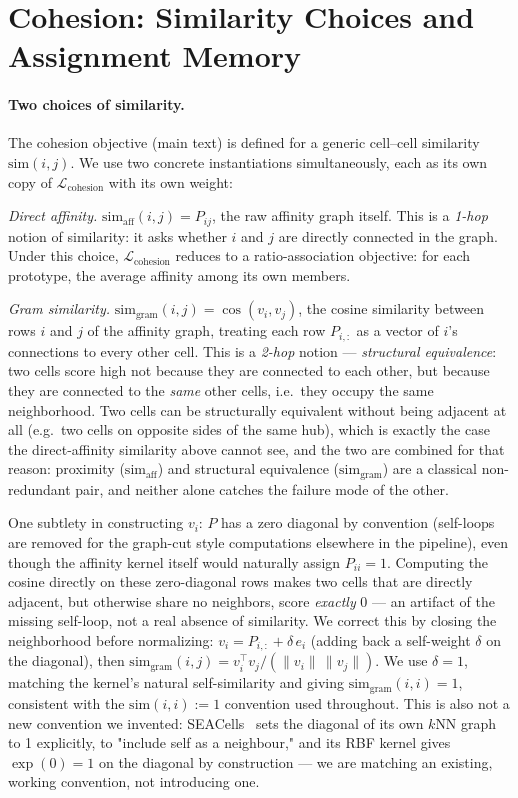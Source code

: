 \section{Cohesion: Similarity Choices and Assignment Memory}
\label{app:cohesion}

\paragraph{Two choices of similarity.}
The cohesion objective (main text) is defined for a generic cell--cell similarity $\mathrm{sim}(i,j)$. We use two concrete instantiations simultaneously, each as its own copy of $\mathcal{L}_{\text{cohesion}}$ with its own weight:

\emph{Direct affinity.} $\mathrm{sim}_{\text{aff}}(i,j) = P_{ij}$, the raw affinity graph itself. This is a \emph{1-hop} notion of similarity: it asks whether $i$ and $j$ are directly connected in the graph. Under this choice, $\mathcal{L}_{\text{cohesion}}$ reduces to a ratio-association objective: for each prototype, the average affinity among its own members.

\emph{Gram similarity.} $\mathrm{sim}_{\text{gram}}(i,j) = \cos(v_i, v_j)$, the cosine similarity between rows $i$ and $j$ of the affinity graph, treating each row $P_{i,:}$ as a vector of $i$'s connections to every other cell. This is a \emph{2-hop} notion --- \emph{structural equivalence}: two cells score high not because they are connected to each other, but because they are connected to the \emph{same} other cells, i.e.\ they occupy the same neighborhood. Two cells can be structurally equivalent without being adjacent at all (e.g.\ two cells on opposite sides of the same hub), which is exactly the case the direct-affinity similarity above cannot see, and the two are combined for that reason: proximity ($\mathrm{sim}_{\text{aff}}$) and structural equivalence ($\mathrm{sim}_{\text{gram}}$) are a classical non-redundant pair, and neither alone catches the failure mode of the other.

One subtlety in constructing $v_i$: $P$ has a zero diagonal by convention (self-loops are removed for the graph-cut style computations elsewhere in the pipeline), even though the affinity kernel itself would naturally assign $P_{ii}=1$. Computing the cosine directly on these zero-diagonal rows makes two cells that are directly adjacent, but otherwise share no neighbors, score \emph{exactly} 0 --- an artifact of the missing self-loop, not a real absence of similarity. We correct this by closing the neighborhood before normalizing: $v_i = P_{i,:} + \delta \, e_i$ (adding back a self-weight $\delta$ on the diagonal), then $\mathrm{sim}_{\text{gram}}(i,j) = v_i^\top v_j / (\|v_i\|\,\|v_j\|)$. We use $\delta = 1$, matching the kernel's natural self-similarity and giving $\mathrm{sim}_{\text{gram}}(i,i)=1$, consistent with the $\mathrm{sim}(i,i):=1$ convention used throughout. This is also not a new convention we invented: SEACells~\citep{seacells} sets the diagonal of its own $k$NN graph to 1 explicitly, to "include self as a neighbour," and its RBF kernel gives $\exp(0)=1$ on the diagonal by construction --- we are matching an existing, working convention, not introducing one.

